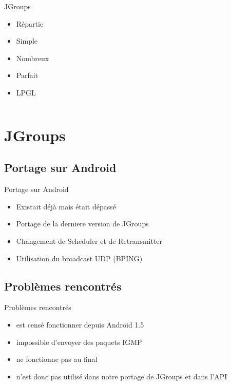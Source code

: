 \documentclass{beamer}
\begin{document}
\begin{frame}
\begin{columns}[t]
\begin{column}{2.6cm}
      \begin{exampleblock}{JGroups}
        \begin{itemize}
          \item Répartie
          \item Simple
          \item Nombreux
          \item Parfait
          \item LPGL
        \end{itemize}
      \end{exampleblock}
    \end{column}
  \end{columns}
\end{frame}



\section{JGroups}

\begin{frame}
  \tableofcontents[currentsection]
\end{frame}


\subsection{Portage sur Android}

\begin{frame}
  \begin{block}{Portage sur Android}
    \begin{itemize}
      \item Existait déjà mais était dépassé
      \item Portage de la derniere version de JGroups
      \item Changement de Scheduler et de Retransmitter
      \item Utilisation du broadcast UDP (BPING)
    \end{itemize}
  \end{block}
\end{frame}


\subsection{Problèmes rencontrés}

\begin{frame}
  \begin{alertblock}{Problèmes rencontrés}
    \begin{itemize}
      \item est censé fonctionner depuis Android 1.5
      \item impossible d'envoyer des paquets IGMP
      \item ne fonctionne pas au final
      \item n'est donc pas utilisé dans notre portage de JGroups et dans l'API
    \end{itemize}
  \end{alertblock}
\end{frame}
\end{document}
